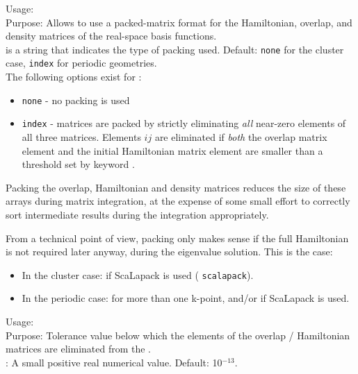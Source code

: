 {
  \noindent
  Usage:   \\[1.0ex]
  Purpose: Allows to use a packed-matrix format for the Hamiltonian,
    overlap, and density matrices of the real-space basis functions. \\[1.0ex]  
   is a string that indicates the type of packing
    used. Default: \texttt{none} for the cluster case, \texttt{index}
    for periodic geometries. \\
}
The following options exist for :
\begin{itemize}
  \item \texttt{none} - no packing is used
  \item \texttt{index} - matrices are packed by
    strictly eliminating \emph{all} near-zero elements of all three 
    matrices. Elements $ij$ are eliminated if \emph{both} the overlap
    matrix element and the initial Hamiltonian matrix element are
    smaller than a threshold set by keyword .
\end{itemize}
Packing the overlap, Hamiltonian and density matrices reduces the size
of these arrays during matrix integration, at the expense of some
small effort to correctly sort intermediate results during the
integration appropriately. 

From a technical point of view,
packing only makes sense if the full Hamiltonian is not required later
anyway, during the eigenvalue solution. This is the case:
\begin{itemize}
  \item In the cluster case: if ScaLapack is used
    ( \texttt{scalapack}).
  \item In the periodic case: for more than one k-point, and/or if
    ScaLapack is used. 
\end{itemize}

{
  \noindent
  Usage:   \\[1.0ex]
  Purpose: Tolerance value below which the elements of the overlap /
    Hamiltonian matrices are eliminated from the
    . \\[1.0ex] 
   : A small positive real numerical value. Default:
    10$^{-13}$. 
}

